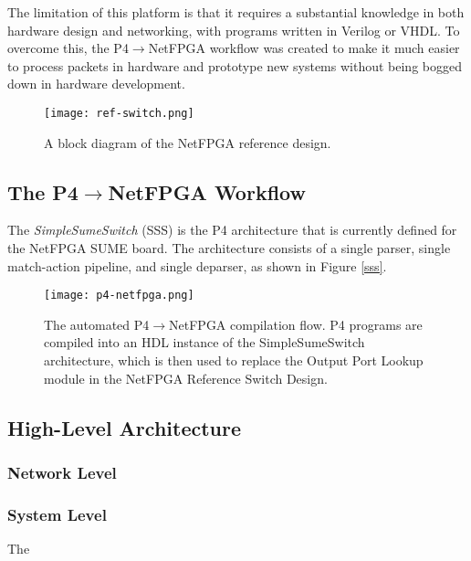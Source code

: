 The limitation of this platform is that it requires a substantial knowledge in both hardware design and networking, with programs written in Verilog or VHDL. To overcome this, the P4$\rightarrow$NetFPGA workflow was created to make it much easier to process packets in hardware and prototype new systems without being bogged down in hardware development.

\begin{figure}[!ht]
	\centering
	\texttt{[image: ref-switch.png]}
	\caption{A block diagram of the NetFPGA reference design.}
	\label{ref-switch}
\end{figure}

\subsection{The P4$\rightarrow$NetFPGA Workflow}
The \textit{SimpleSumeSwitch} (SSS) is the P4 architecture that is currently defined for the NetFPGA SUME board. The architecture consists of a single parser, single match-action pipeline, and single deparser, as shown in Figure \ref{sss}.





\begin{figure}
	\centering
	\texttt{[image: p4-netfpga.png]}
	\caption{The automated P4$\rightarrow$NetFPGA compilation flow. P4 programs are compiled into an HDL instance of the SimpleSumeSwitch architecture, which is then used to replace the Output Port Lookup module in the NetFPGA Reference Switch Design.}
	\label{p4-netfpga}
\end{figure}



\subsection{High-Level Architecture}
	\subsubsection{Network Level}

	\subsubsection{System Level}
The
